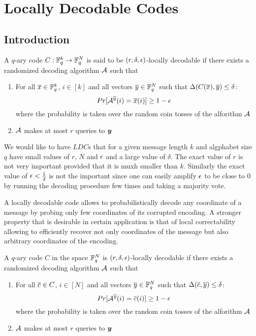 \chapter{Locally Decodable Codes}
\section{Introduction}

\begin{definition}
	A $q$-ary code $C:\mathbb{F}^k_q\to \mathbb{F}_q^N$ is said to be $(r,\delta, \epsilon)$-locally decodable if there exists a randomized decoding algorithm $\mathcal{A}$ such that \begin{enumerate}
		\item For all $\overline{x}\in \mathbb{F}_q^k$, $i\in [k]$ and all vectors $\overline{y}\in \mathbb{F}_q^N$ such that $\Delta(C(\overline{x}),\overline{y})\leq \delta$: $$Pr[\mathcal{A}^{\overline{y}}(i)=\overline{x}(i)]\geq 1-\epsilon$$where the probability is taken over the random coin tosses of the alforithm $\mathcal{A}$
		\item $\mathcal{A}$ makes at most $r$ queries to $\boldsymbol{y}$
	\end{enumerate}
\end{definition}

We would like to have $LDC$s that for a given message length $k$ and algphabet size $q$ have small values of $r$, $N$ and $\epsilon$ and a large value of $\delta$. The exact value of $r$ is not very important provided that it is muxh smaller than $k$. Similarly the exact value of $\epsilon<\frac12$ is not the important since one can easily amplify $\epsilon$ to be close to 0 by running the decoding procedure few times and taking a majority vote. 

A locally decodable code allows to probabilistically decode any coordinate of a message by probing only few coordinates of its corrupted encoding. A stronger property that is desirable in certain application is that of local correctability allowing to efficiently recover not only coordinates of the message but also arbitrary coordinates of the encoding. 

\begin{definition}
	A $q$-ary code $C$ in the space $ \mathbb{F}_q^N$ is  $(r,\delta, \epsilon)$-locally decodable if there exists a randomized decoding algorithm $\mathcal{A}$ such that \begin{enumerate}
	\item For all $\overline{c}\in C$, $i\in [N]$ and all vectors $\overline{y}\in \mathbb{F}_q^N$ such that $\Delta(\overline{c},\overline{y})\leq \delta$: $$Pr[\mathcal{A}^{\overline{y}}(i)=\overline{c}(i)]\geq 1-\epsilon$$where the probability is taken over the random coin tosses of the alforithm $\mathcal{A}$
	\item $\mathcal{A}$ makes at most $r$ queries to $\boldsymbol{y}$
\end{enumerate}
\end{definition}

